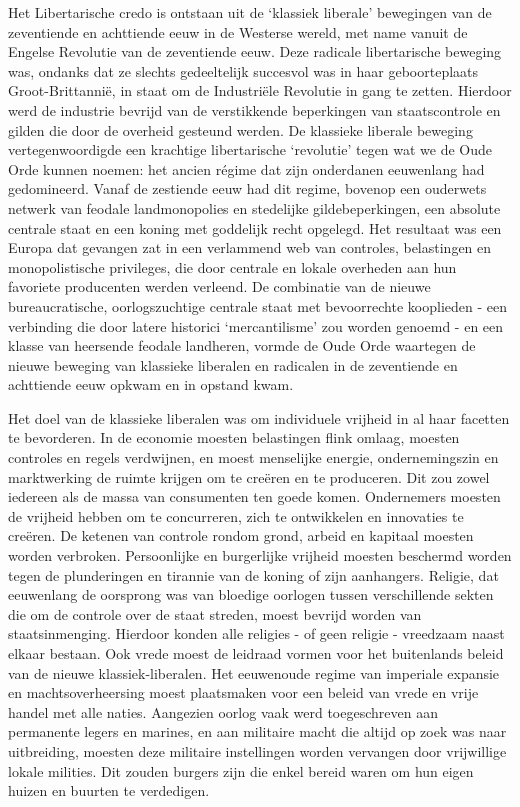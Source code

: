 \documentclass[
  a5paper,
  smalldemyvopaper,10pt,twoside,onecolumn,openright,extrafontsizes,hidelinks]{memoir}
\begin{document}
Het Libertarische credo is ontstaan uit de `klassiek liberale'
bewegingen van de zeventiende en achttiende eeuw in de Westerse wereld,
met name vanuit de Engelse Revolutie van de zeventiende eeuw. Deze
radicale libertarische beweging was, ondanks dat ze slechts gedeeltelijk
succesvol was in haar geboorteplaats Groot-Brittannië, in staat om de
Industriële Revolutie in gang te zetten. Hierdoor werd de industrie
bevrijd van de verstikkende beperkingen van staatscontrole en gilden die
door de overheid gesteund werden. De klassieke liberale beweging
vertegenwoordigde een krachtige libertarische `revolutie' tegen wat we
de Oude Orde kunnen noemen: het ancien régime dat zijn onderdanen
eeuwenlang had gedomineerd. Vanaf de zestiende eeuw had dit regime,
bovenop een ouderwets netwerk van feodale landmonopolies en stedelijke
gildebeperkingen, een absolute centrale staat en een koning met
goddelijk recht opgelegd. Het resultaat was een Europa dat gevangen zat
in een verlammend web van controles, belastingen en monopolistische
privileges, die door centrale en lokale overheden aan hun favoriete
producenten werden verleend. De combinatie van de nieuwe
bureaucratische, oorlogszuchtige centrale staat met bevoorrechte
kooplieden - een verbinding die door latere historici `mercantilisme'
zou worden genoemd - en een klasse van heersende feodale landheren,
vormde de Oude Orde waartegen de nieuwe beweging van klassieke liberalen
en radicalen in de zeventiende en achttiende eeuw opkwam en in opstand
kwam.

Het doel van de klassieke liberalen was om individuele vrijheid in al
haar facetten te bevorderen. In de economie moesten belastingen flink
omlaag, moesten controles en regels verdwijnen, en moest menselijke
energie, ondernemingszin en marktwerking de ruimte krijgen om te creëren
en te produceren. Dit zou zowel iedereen als de massa van consumenten
ten goede komen. Ondernemers moesten de vrijheid hebben om te
concurreren, zich te ontwikkelen en innovaties te creëren. De ketenen
van controle rondom grond, arbeid en kapitaal moesten worden verbroken.
Persoonlijke en burgerlijke vrijheid moesten beschermd worden tegen de
plunderingen en tirannie van de koning of zijn aanhangers. Religie, dat
eeuwenlang de oorsprong was van bloedige oorlogen tussen verschillende
sekten die om de controle over de staat streden, moest bevrijd worden
van staatsinmenging. Hierdoor konden alle religies - of geen religie -
vreedzaam naast elkaar bestaan. Ook vrede moest de leidraad vormen voor
het buitenlands beleid van de nieuwe klassiek-liberalen. Het eeuwenoude
regime van imperiale expansie en machtsoverheersing moest plaatsmaken
voor een beleid van vrede en vrije handel met alle naties. Aangezien
oorlog vaak werd toegeschreven aan permanente legers en marines, en aan
militaire macht die altijd op zoek was naar uitbreiding, moesten deze
militaire instellingen worden vervangen door vrijwillige lokale
milities. Dit zouden burgers zijn die enkel bereid waren om hun eigen
huizen en buurten te verdedigen.
\end{document}
